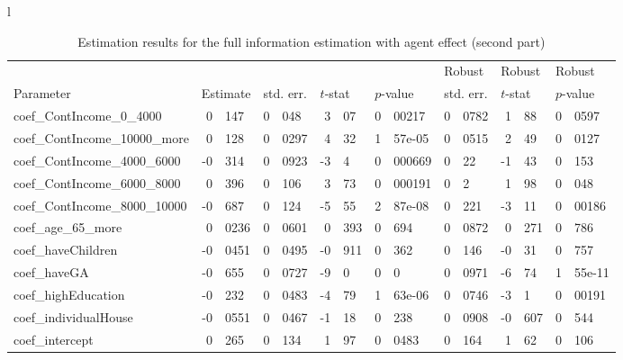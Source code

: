 \documentclass[12pt,a4paper]{article}
\begin{document}
 \begin{sidewaystable}[htb]
\caption{\label{tab:fi-sc-2}Estimation results for the full information
  estimation with agent effect (second part)}
  \begin{tabular}{l}
\begin{tabular}{lr@{.}lr@{.}lr@{.}lr@{.}lr@{.}lr@{.}lr@{.}l}
                      &   \multicolumn{2}{l}{}    & \multicolumn{2}{l}{} & \multicolumn{2}{l}{}  &     \multicolumn{2}{l}{} &   \multicolumn{2}{l}{Robust}    & \multicolumn{2}{l}{Robust}  &     \multicolumn{2}{l}{Robust}   \\
Parameter      & \multicolumn{2}{l}{Estimate}  &
\multicolumn{2}{l}{std. err.}  &  \multicolumn{2}{l}{$t$-stat}  &   \multicolumn{2}{l}{$p$-value}  &
\multicolumn{2}{l}{std. err.}  &  \multicolumn{2}{l}{$t$-stat}  &   \multicolumn{2}{l}{$p$-value}   \\
\hline
coef\_ContIncome\_0\_4000     &   0&147 &    0&048 &    3&07 &  0&00217 &        0&0782 &         1&88 &        0&0597 \\
coef\_ContIncome\_10000\_more &   0&128 &   0&0297 &    4&32 & 1&57e-05 &        0&0515 &         2&49 &        0&0127 \\
coef\_ContIncome\_4000\_6000  &  -0&314 &   0&0923 &    -3&4 & 0&000669 &          0&22 &        -1&43 &         0&153 \\
coef\_ContIncome\_6000\_8000  &   0&396 &    0&106 &    3&73 & 0&000191 &           0&2 &         1&98 &         0&048 \\
coef\_ContIncome\_8000\_10000 &  -0&687 &    0&124 &   -5&55 & 2&87e-08 &         0&221 &        -3&11 &       0&00186 \\
coef\_age\_65\_more           &  0&0236 &   0&0601 &   0&393 &    0&694 &        0&0872 &        0&271 &         0&786 \\
coef\_haveChildren          & -0&0451 &   0&0495 &  -0&911 &    0&362 &         0&146 &        -0&31 &         0&757 \\
coef\_haveGA                &  -0&655 &   0&0727 &    -9&0 &      0&0 &        0&0971 &        -6&74 &      1&55e-11 \\
coef\_highEducation         &  -0&232 &   0&0483 &   -4&79 & 1&63e-06 &        0&0746 &         -3&1 &       0&00191 \\
coef\_individualHouse       & -0&0551 &   0&0467 &   -1&18 &    0&238 &        0&0908 &       -0&607 &         0&544 \\
coef\_intercept             &   0&265 &    0&134 &    1&97 &   0&0483 &         0&164 &         1&62 &         0&106 \\

\end{tabular}
\end{tabular}
\end{sidewaystable}
\end{document}
